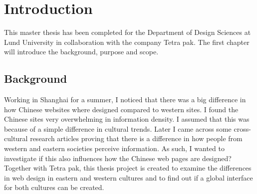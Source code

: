 
\chapter{Introduction} %

\label{Introduction} %


\newcommand{\keyword}[1]{\textbf{#1}}
\newcommand{\tabhead}[1]{\textbf{#1}}
\newcommand{\code}[1]{\texttt{#1}}
\newcommand{\file}[1]{\texttt{\bfseries#1}}
\newcommand{\option}[1]{\texttt{\itshape#1}}



This master thesis has been completed for the Department of Design Sciences at Lund University in collaboration with the company Tetra pak. The first chapter will introduce the background, purpose and scope.

\section{Background}
Working in Shanghai for a summer, I noticed that there was a big difference in how Chinese websites where designed compared to western sites. I found the Chinese sites very overwhelming in information density. I assumed that this was because of a simple difference in cultural trends. Later I came across some cross-cultural research articles proving that there is a difference in how people from western and eastern societies perceive information. As such, I wanted to investigate if this also influences how the Chinese web pages are designed? Together with Tetra pak, this thesis project is created to examine the differences in web design in eastern and western cultures and to find out if a global interface for both cultures can be created.


